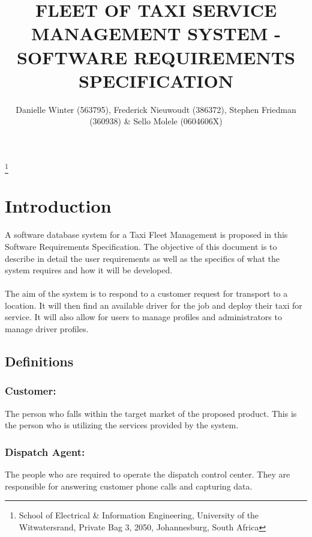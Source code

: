 \documentclass[10pt,twocolumn]{witseiepaper}
\begin{document}
\title{FLEET OF TAXI SERVICE MANAGEMENT SYSTEM - SOFTWARE REQUIREMENTS SPECIFICATION}

\author{Danielle Winter (563795), Frederick Nieuwoudt (386372), Stephen Friedman (360938) \& Sello Molele (0604606X)}
\thanks{School of Electrical \& Information Engineering, University of the
Witwatersrand, Private Bag 3, 2050, Johannesburg, South Africa}


%

\maketitle
\thispagestyle{empty}\pagestyle{empty}


%
\section{Introduction}
A software database system for a Taxi Fleet Management is proposed in this Software Requirements Specification. The objective of this document is to describe in detail the user requirements as well as the specifics of what the system requires and how it will be developed.\\\\
The aim of the system is to respond to a customer request for transport to a location. It will then find an available driver for the job and deploy their taxi for service. It will also allow for users to manage profiles and administrators to manage driver profiles.

\subsection{Definitions}

\subsubsection{Customer:}
The person who falls within the target market of the proposed product. This is the person who is utilizing the services provided by the system.

\subsubsection{Dispatch Agent:}
The people who are required to operate the dispatch control center. They are responsible for answering customer phone calls and capturing data.
\end{document}
